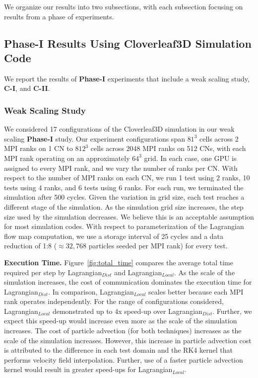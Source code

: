 We organize our results into two subsections, with each subsection focusing on results from a phase of experiments.
\subsection{Phase-I Results Using Cloverleaf3D Simulation Code}
\label{sec:experiment1}
We report the results of \textbf{Phase-I} experiments that include a weak scaling study, \textbf{C-I}, and \textbf{C-II}.
\subsubsection{Weak Scaling Study} 
We considered 17 configurations of the Cloverleaf3D simulation in our weak scaling \textbf{Phase-I} study. 
%
Our experiment configurations span $81^{3}$ cells across 2 MPI ranks on 1 CN to $812^{3}$ cells across 2048 MPI ranks on 512 CNs, with each MPI rank operating on an approximately $64^{3}$ grid.
%
In each case, one GPU is assigned to every MPI rank, and we vary the number of ranks per CN.
%
With respect to the number of MPI ranks on each CN, we run 1 test using 2 ranks, 10 tests using 4 ranks, and 6 tests using 6 ranks.
%
For each run, we terminated the simulation after 500 cycles.
%
Given the variation in grid size, each test reaches a different stage of the simulation.
%
As the simulation grid size increases, the step size used by the simulation decreases.
%
We believe this is an acceptable assumption for most simulation codes.
%
With respect to parameterization of the Lagrangian flow map computation, we use a storage interval of 25 cycles and a data reduction of 1:8 ($\approx32,768$ particles seeded per MPI rank) for every test.

\textbf{Execution Time.} Figure~\ref{fig:total_time} compares the average total time required per step by Lagrangian$_{Dist}$ and Lagrangian$_{Local}$.
%
As the scale of the simulation increases, the cost of communication dominates the execution time for Lagrangian$_{Dist}$.  
%
In comparison, Lagrangian$_{Local}$ scales better because each MPI rank operates independently.
%
For the range of configurations considered, Lagrangian$_{Local}$ demonstrated up to 4x speed-up over Lagrangian$_{Dist}$.
%
Further, we expect this speed-up would increase even more as the scale of the simulation increases.
%
The cost of particle advection (for both techniques) increases as the scale of the simulation increases.
%
However, this increase in particle advection cost is attributed to the difference in each test domain and the RK4 kernel that performs velocity field interpolation.
%
%
Further, use of a faster particle advection kernel would result in greater speed-ups for Lagrangian$_{Local}$.



